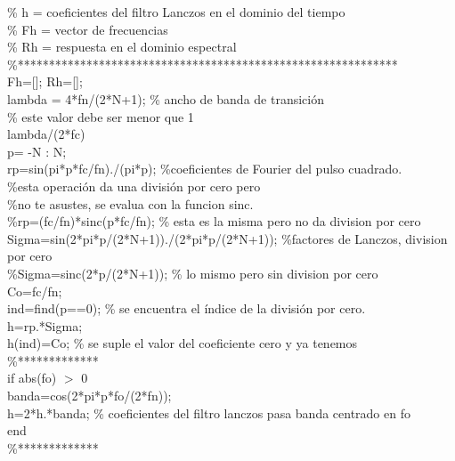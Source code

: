 \documentclass[
]{agujournal2019}
\begin{document}
\begin{framed}
\% h = coeficientes del filtro Lanczos en el dominio del tiempo\\
\% Fh = vector de frecuencias\\
\% Rh = respuesta en el dominio espectral\\

\%*************************************************************\\
Fh=[]; Rh=[];\\
lambda = 4*fn/(2*N+1); \% ancho de banda de transición\\

\% este valor debe ser menor que 1\\
lambda/(2*fc)\\

p= -N : N;\\
rp=sin(pi*p*fc/fn)./(pi*p);  \%coeficientes de Fourier del pulso cuadrado.\\
\%esta operación da una división por cero pero\\
\%no te asustes, se evalua con la funcion sinc.\\
\%rp=(fc/fn)*sinc(p*fc/fn);  \% esta es la misma pero no da division por cero\\

Sigma=sin(2*pi*p/(2*N+1))./(2*pi*p/(2*N+1)); \%factores de Lanczos, division por cero\\
\%Sigma=sinc(2*p/(2*N+1)); \% lo mismo pero sin division por cero\\
Co=fc/fn;\\
ind=find(p==0); \% se encuentra el índice de la división por cero. \\
h=rp.*Sigma;\\
h(ind)=Co; \% se suple el valor del coeficiente cero y ya tenemos
\\
\%*************\\
if abs(fo) $>$ 0\\
 banda=cos(2*pi*p*fo/(2*fn));\\
 h=2*h.*banda;  \% coeficientes del filtro lanczos pasa banda centrado en fo\\
end\\
\%*************\\
\end{framed}
\end{document}
